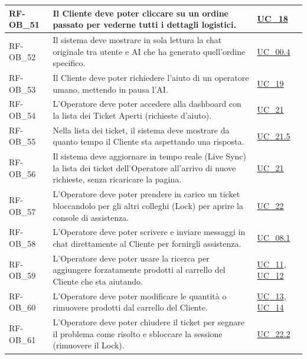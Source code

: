 \begin{longtable}{|>{\raggedright}p{}|>{\raggedright\arraybackslash}p{}|>{\raggedright\arraybackslash}p{}|}
    \hline
    RF-OB\_51 \hypertarget{rf-ob_51} & Il Cliente deve poter cliccare su un ordine passato per vederne tutti i dettagli logistici. & \hyperref[uc_18]{UC\_18} \\
    \hline
    RF-OB\_52 \hypertarget{rf-ob_52} & Il sistema deve mostrare in sola lettura la chat originale tra utente e AI che ha generato quell'ordine specifico. & \hyperref[uc_00.4]{UC\_00.4} \\
    \hline
    RF-OB\_53 \hypertarget{rf-ob_53} & Il Cliente deve poter richiedere l'aiuto di un operatore umano, mettendo in pausa l'AI. & \hyperref[uc_19]{UC\_19} \\
    \hline
    RF-OB\_54 \hypertarget{rf-ob_54} & L'Operatore deve poter accedere alla dashboard con la lista dei Ticket Aperti (richieste d'aiuto). & \hyperref[uc_21]{UC\_21} \\
    \hline
    RF-OB\_55 \hypertarget{rf-ob_55} & Nella lista dei ticket, il sistema deve mostrare da quanto tempo il Cliente sta aspettando una risposta. & \hyperref[uc_21.5]{UC\_21.5} \\
    \hline
    RF-OB\_56 \hypertarget{rf-ob_56} & Il sistema deve aggiornare in tempo reale (Live Sync) la lista dei ticket dell'Operatore all'arrivo di nuove richieste, senza ricaricare la pagina. & \hyperref[uc_21]{UC\_21} \\
    \hline
    RF-OB\_57 \hypertarget{rf-ob_57} & L'Operatore deve poter prendere in carico un ticket bloccandolo per gli altri colleghi (Lock) per aprire la console di assistenza. & \hyperref[uc_22]{UC\_22} \\
    \hline
    RF-OB\_58 \hypertarget{rf-ob_58} & L'Operatore deve poter scrivere e inviare messaggi in chat direttamente al Cliente per fornirgli assistenza. & \hyperref[uc_08.1]{UC\_08.1} \\
    \hline
    RF-OB\_59 \hypertarget{rf-ob_59} & L'Operatore deve poter usare la ricerca per aggiungere forzatamente prodotti al carrello del Cliente che sta aiutando. & \hyperref[uc_11]{UC\_11}, \hyperref[uc_12]{UC\_12} \\
    \hline
    RF-OB\_60 \hypertarget{rf-ob_60} & L'Operatore deve poter modificare le quantità o rimuovere prodotti dal carrello del Cliente. & \hyperref[uc_13]{UC\_13}, \hyperref[uc_14]{UC\_14} \\
    \hline
    RF-OB\_61 \hypertarget{rf-ob_61} & L'Operatore deve poter chiudere il ticket per segnare il problema come risolto e sbloccare la sessione (rimuovere il Lock). & \hyperref[uc_22.2]{UC\_22.2} \\

\end{longtable}
